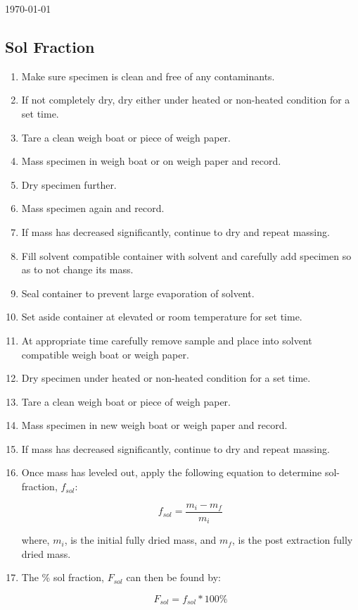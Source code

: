 \documentclass[11pt, oneside]{article}   	%
\begin{document}
\today							%

\subsection{Sol Fraction}				%

\begin{enumerate}

\item Make sure specimen is clean and free of any contaminants.
\item If not completely dry, dry either under heated or non-heated condition for a set time.
\item Tare a clean weigh boat or piece of weigh paper.
\item Mass specimen in weigh boat or on weigh paper and record.
\item Dry specimen further.
\item Mass specimen again and record.
\item If mass has decreased significantly, continue to dry and repeat massing.
\item Fill solvent compatible container with solvent and carefully add specimen so as to not change its mass.
\item Seal container to prevent large evaporation of solvent.
\item Set aside container at elevated or room temperature for set time.
\item At appropriate time carefully remove sample and place into solvent compatible weigh boat or weigh paper.
\item Dry specimen under heated or non-heated condition for a set time.
\item Tare a clean weigh boat or piece of weigh paper.
\item Mass specimen in new weigh boat or weigh paper and record.
\item If mass has decreased significantly, continue to dry and repeat massing.
\item Once mass has leveled out, apply the following equation to determine sol-fraction, $f_{sol}$:

    \begin{equation}
    	f_{sol} = \frac{m_{i} - m_{f}}{m_{i}}
    \end{equation}
    
    \noindent
    where, $m_{i}$, is the initial fully dried mass, and $m_{f}$, is the post extraction fully dried mass.  
    
\item The \% sol fraction, $F_{sol}$ can then be found by:

    \begin{equation}
    	F_{sol} = f_{sol}*100\%
    \end{equation}

\end{enumerate}
\end{document}

